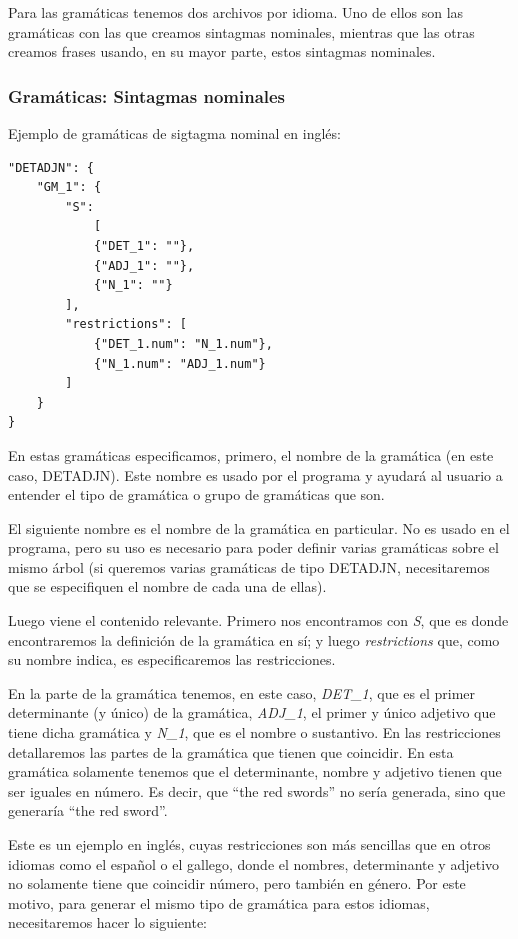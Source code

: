 Para las gramáticas tenemos dos archivos por idioma. Uno de ellos son las gramáticas con las que creamos sintagmas nominales, mientras que las otras creamos frases usando, en su mayor parte, estos sintagmas nominales.

\subsubsection{Gramáticas: Sintagmas nominales}

Ejemplo de gramáticas de sigtagma nominal en inglés:

\begin{lstlisting}[style=json]
"DETADJN": {
    "GM_1": {
        "S": 
            [
            {"DET_1": ""}, 
            {"ADJ_1": ""}, 
            {"N_1": ""}
        ],
        "restrictions": [
            {"DET_1.num": "N_1.num"},
            {"N_1.num": "ADJ_1.num"}
        ]
    }
}
\end{lstlisting}

En estas gramáticas especificamos, primero, el nombre de la gramática (en este caso, DETADJN). Este nombre es usado por el programa y ayudará al usuario a entender el tipo de gramática o grupo de gramáticas que son.

El siguiente nombre es el nombre de la gramática en particular. No es usado en el programa, pero su uso es necesario para poder definir varias gramáticas sobre el mismo árbol (si queremos varias gramáticas de tipo DETADJN, necesitaremos que se especifiquen el nombre de cada una de ellas).

Luego viene el contenido relevante. Primero nos encontramos con \textit{S}, que es donde encontraremos la definición de la gramática en sí; y luego \textit{restrictions} que, como su nombre indica, es especificaremos las restricciones.

En la parte de la gramática tenemos, en este caso, \textit{DET\_1}, que es el primer determinante (y único) de la gramática, \textit{ADJ\_1}, el primer y único adjetivo que tiene dicha gramática y \textit{N\_1}, que es el nombre o sustantivo.
En las restricciones detallaremos las partes de la gramática que tienen que coincidir. En esta gramática solamente tenemos que el determinante, nombre y adjetivo tienen que ser iguales en número. Es decir, que ``the red swords'' no sería generada, sino que generaría ``the red sword''.

Este es un ejemplo en inglés, cuyas restricciones son más sencillas que en otros idiomas como el español o el gallego, donde el nombres, determinante y adjetivo no solamente tiene que coincidir número, pero también en género. Por este motivo, para generar el mismo tipo de gramática para estos idiomas, necesitaremos hacer lo siguiente:

